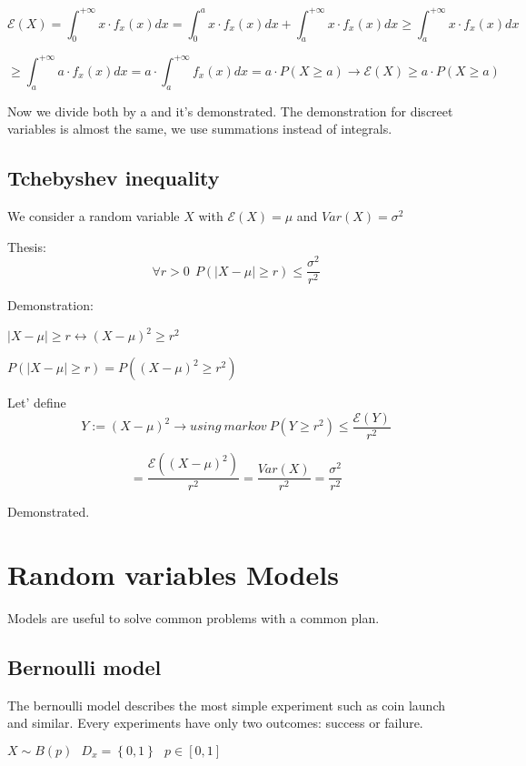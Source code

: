 \documentclass{article}
\begin{document}
$$\mathcal E(X) = \int_{0}^{+ \infty} x \cdot f_x(x)dx = \int_{0}^ax\cdot f_x(x)dx + \int_{a}^{+ \infty} x \cdot f_x(x)dx \geq \int_{a}^{+ \infty} x \cdot f_x(x)dx$$

\bigskip 

$$\geq \int_{a}^{+ \infty} a \cdot f_x(x)dx = a \cdot \int_{a}^{+ \infty} f_x(x)dx = a \cdot P(X \geq a) \longrightarrow \mathcal E(X) \geq a \cdot P(X \geq a)$$

Now we divide both by a and it's demonstrated. The demonstration for discreet variables is almost the same, we use summations instead of integrals.

\subsection{Tchebyshev inequality}

We consider a random variable $X$ with $\mathcal E(X) = \mu$ and $Var(X) = \sigma^2$

Thesis:
$$\forall r > 0 \ \ P(|X - \mu| \geq r) \leq \frac{\sigma^2}{r^2}$$
\bigskip

Demonstration:

$|X - \mu| \geq r \leftrightarrow (X - \mu)^2 \geq r^2$
\bigskip

$P(|X - \mu| \geq r) = P((X - \mu)^2 \geq r^2)$

Let' define $$Y:= (X - \mu)^2 \rightarrow using \ markov \ P(Y \geq r^2) \leq \frac{\mathcal E(Y)}{r^2}$$

$$= \frac{\mathcal E((X- \mu)^2)}{r^2} = \frac{Var(X)}{r^2} = \frac{\sigma^2}{r^2}$$

Demonstrated.

\section{Random variables Models}

Models are useful to solve common problems with a common plan.

\subsection{Bernoulli model}

The bernoulli model describes the most simple experiment such as coin launch and similar. Every experiments have only two outcomes: success or failure.
\bigskip

$X \sim B(p) \ \ \ D_x = \left\{0,1\right\} \ \ \ p \in [0,1]$
\bigskip
\end{document}
